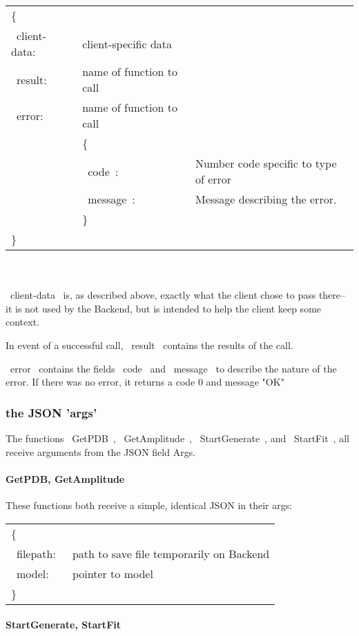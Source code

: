 \documentclass[12pt]{article}
\begin{document}
	\begin{tabular}{l l l}
		\{ \\
		~client-data:~ &  client-specific data & \\ 
		~result:~ & name of function to call & \\ 
		~error:~ & name of function to call &\\ 
		&	\{\\
		& ~code~: & Number code specific to type of error\\
		& ~message~: & Message describing the error.\\
		&	\} \\
		\}
	\end{tabular} 
\\
\\
	
~client-data~ is, as described above, exactly what the client chose to pass there-- it is not used by the Backend, but is intended to help the client keep some context.

In event of a successful call, ~result~ contains the results of the call.

~error~ contains the fields ~code~ and ~message~ to describe the nature of the error. If there was no error, it returns a code 0 and message "OK"

\subsubsection{the JSON 'args'}

The functions ~GetPDB~, ~GetAmplitude~, ~StartGenerate~, and ~StartFit~,  all receive arguments from the JSON field Args.

\paragraph{GetPDB, GetAmplitude}

These functions both receive a simple, identical JSON in their args:
\\

\begin{tabular}{l l}
	\{ \\
	~filepath:~ &  path to save file temporarily on Backend\\ 
	~model:~ & pointer to model\\ 
	\} 
\end{tabular} 

\paragraph{StartGenerate, StartFit}
\end{document}
